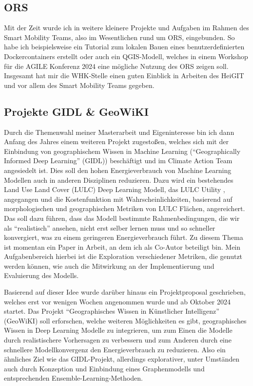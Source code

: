 \documentclass[11pt]{article}
\begin{document}
\subsection{ORS}

Mit der Zeit wurde ich in weitere kleinere Projekte und Aufgaben im Rahmen des Smart Mobility Teams, also im Wesentlichen rund um ORS, eingebunden. So habe ich beispielsweise ein Tutorial zum lokalen Bauen eines benutzerdefinierten Dockercontainers erstellt \autocite{HeiGIT2024d} oder auch ein QGIS-Modell, welches in einem Workshop für die AGILE Konferenz 2024 eine mögliche Nutzung des ORS zeigen soll. Insgesamt hat mir die WHK-Stelle einen guten Einblick in Arbeiten des HeiGIT und vor allem des Smart Mobility Teams gegeben.

\subsection{Projekte GIDL \& GeoWiKI}

Durch die Themenwahl meiner Masterarbeit und Eigeninteresse bin ich dann Anfang des Jahres einem weiteren Projekt zugestoßen, welches sich mit der Einbindung von geographischem Wissen in Machine Learning (\enquote{Geographically Informed Deep Learning} (GIDL)) beschäftigt und im Climate Action Team angesiedelt ist. Dies soll den hohen Energieverbrauch von Machine Learning Modellen auch in anderen Disziplinen reduzieren. Dazu wird ein bestehendes Land Use Land Cover (LULC) Deep Learning Modell, das LULC Utility \autocite{HeiGIT2024c}, angegangen und die Kostenfunktion mit Wahrscheinlichkeiten, basierend auf morphologischen und geographischen Metriken von LULC Flächen, angereichert. Das soll dazu führen, dass das Modell bestimmte Rahmenbedingungen, die wir als \enquote{realistisch} ansehen, nicht erst selber lernen muss und so schneller konvergiert, was zu einem geringeren Energieverbrauch führt. Zu diesem Thema ist momentan ein Paper in Arbeit, an dem ich als Co-Autor beteiligt bin. Mein Aufgabenbereich hierbei ist die Exploration verschiedener Metriken, die genutzt werden können, wie auch die Mitwirkung an der Implementierung und Evaluierung des Modells.

Basierend auf dieser Idee wurde darüber hinaus ein Projektproposal geschrieben, welches erst vor wenigen Wochen angenommen wurde und  ab Oktober 2024 startet. Das Projekt \enquote{Geographisches Wissen in Künstlicher Intelligenz} (GeoWiKI) soll erforschen, welche weiteren Möglichkeiten es gibt, geographisches Wissen in Deep Learning Modelle zu integrieren, um zum Einen die Modelle durch realistischere Vorhersagen zu verbessern und zum Anderen durch eine schnellere Modellkonvergenz den Energieverbrauch zu reduzieren. Also ein ähnliches Ziel wie das GIDL-Projekt, allerdings explorativer, unter Umständen auch durch Konzeption und Einbindung eines Graphenmodells und entsprechenden Ensemble-Learning-Methoden.
\end{document}
